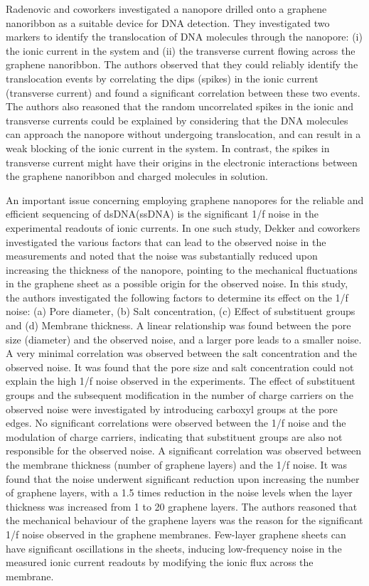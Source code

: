 Radenovic and coworkers investigated a nanopore drilled onto a graphene nanoribbon as a suitable device for DNA detection\supercite{traversi_detecting_2013}. They investigated two markers to identify the translocation of DNA molecules through the nanopore: (i) the ionic current in the system and (ii) the transverse current flowing across the graphene nanoribbon. The authors observed that they could reliably identify the translocation events by correlating the dips (spikes) in the ionic current (transverse current) and found a significant correlation between these two events. The authors also reasoned that the random uncorrelated spikes in the ionic and transverse currents could be explained by considering that the DNA molecules can approach the nanopore without undergoing translocation, and can result in a weak blocking of the ionic current in the system. In contrast, the spikes in transverse current might have their origins in the electronic interactions between the graphene nanoribbon and charged molecules in solution.

An important issue concerning employing graphene nanopores for the reliable and efficient sequencing of dsDNA(ssDNA) is the significant 1/f noise in the experimental readouts of ionic currents. In one such study, Dekker and coworkers investigated the various factors that can lead to the observed noise in the measurements and noted that the noise was substantially reduced upon increasing the thickness of the nanopore, pointing to the mechanical fluctuations in the graphene sheet as a possible origin for the observed noise\supercite{heerema_1f_2015}. In this study, the authors investigated the following factors to determine its effect on the 1/f noise: (a) Pore diameter, (b) Salt concentration, (c) Effect of substituent groups and (d) Membrane thickness. A linear relationship was found between the pore size (diameter) and the observed noise, and a larger pore leads to a smaller noise. A very minimal correlation was observed between the salt concentration and the observed noise. It was found that the pore size and salt concentration could not explain the high 1/f noise observed in the experiments. The effect of substituent groups and the subsequent modification in the number of charge carriers on the observed noise were investigated by introducing carboxyl groups at the pore edges. No significant correlations were observed between the 1/f noise and the modulation of charge carriers, indicating that substituent groups are also not responsible for the observed noise. A significant correlation was observed between the membrane thickness (number of graphene layers) and the 1/f noise. It was found that the noise underwent significant reduction upon increasing the number of graphene layers, with a 1.5 times reduction in the noise levels when the layer thickness was increased from 1 to 20 graphene layers. The authors reasoned that the mechanical behaviour of the graphene layers was the reason for the significant 1/f noise observed in the graphene membranes. Few-layer graphene sheets can have significant oscillations in the sheets, inducing low-frequency noise in the measured ionic current readouts by modifying the ionic flux across the membrane.

